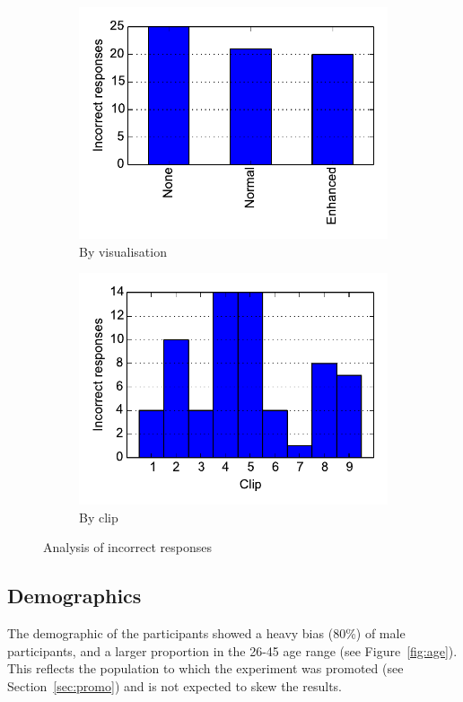 \begin{figure}[ht]
\centering
\begin{subfigure}{.5\textwidth}
  \centering
  \includegraphics[width=\linewidth]{figs/rejects-vis.pdf}
  \caption{By visualisation}
  \label{fig:rejectvis}
\end{subfigure}%
\begin{subfigure}{.5\textwidth}
  \centering
  \includegraphics[width=\linewidth]{figs/rejects-clip.pdf}
  \caption{By clip}
  \label{fig:rejectclip}
\end{subfigure}
\caption{Analysis of incorrect responses}
\label{fig:rejects}
\end{figure}

\subsection{Demographics}
The demographic of the participants showed a heavy bias (80\%) of male
participants, and a larger proportion in the 26-45 age range (see
Figure~\ref{fig:age}). This reflects the population to which the experiment was
promoted (see Section~\ref{sec:promo}) and is not expected to skew the results.

